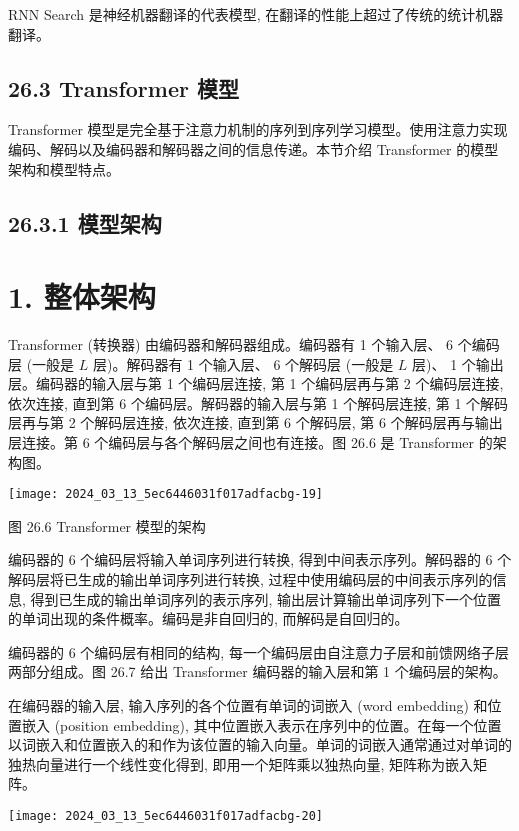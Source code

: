 \documentclass[10pt]{article}
\begin{document}
RNN Search 是神经机器翻译的代表模型, 在翻译的性能上超过了传统的统计机器翻译。

\subsection*{26.3 Transformer 模型}
Transformer 模型是完全基于注意力机制的序列到序列学习模型。使用注意力实现编码、解码以及编码器和解码器之间的信息传递。本节介绍 Transformer 的模型架构和模型特点。

\subsection*{26.3.1 模型架构}
\section*{1. 整体架构}
Transformer (转换器) 由编码器和解码器组成。编码器有 1 个输入层、 6 个编码层 (一般是 $L$ 层)。解码器有 1 个输入层、 6 个解码层 (一般是 $L$ 层)、 1 个输出层。编码器的输入层与第 1 个编码层连接, 第 1 个编码层再与第 2 个编码层连接, 依次连接, 直到第 6 个编码层。解码器的输入层与第 1 个解码层连接, 第 1 个解码层再与第 2 个解码层连接, 依次连接, 直到第 6 个解码层, 第 6 个解码层再与输出层连接。第 6 个编码层与各个解码层之间也有连接。图 26.6 是 Transformer 的架构图。

\begin{center}
\texttt{[image: 2024\_03\_13\_5ec6446031f017adfacbg-19]}
\end{center}

图 26.6 Transformer 模型的架构

编码器的 6 个编码层将输入单词序列进行转换, 得到中间表示序列。解码器的 6 个解码层将已生成的输出单词序列进行转换, 过程中使用编码层的中间表示序列的信息, 得到已生成的输出单词序列的表示序列, 输出层计算输出单词序列下一个位置的单词出现的条件概率。编码是非自回归的, 而解码是自回归的。

编码器的 6 个编码层有相同的结构, 每一个编码层由自注意力子层和前馈网络子层两部分组成。图 26.7 给出 Transformer 编码器的输入层和第 1 个编码层的架构。

在编码器的输入层, 输入序列的各个位置有单词的词嵌入 (word embedding) 和位置嵌入 (position embedding), 其中位置嵌入表示在序列中的位置。在每一个位置以词嵌入和位置嵌入的和作为该位置的输入向量。单词的词嵌入通常通过对单词的独热向量进行一个线性变化得到, 即用一个矩阵乘以独热向量, 矩阵称为嵌入矩阵。

\begin{center}
\texttt{[image: 2024\_03\_13\_5ec6446031f017adfacbg-20]}
\end{center}
\end{document}
